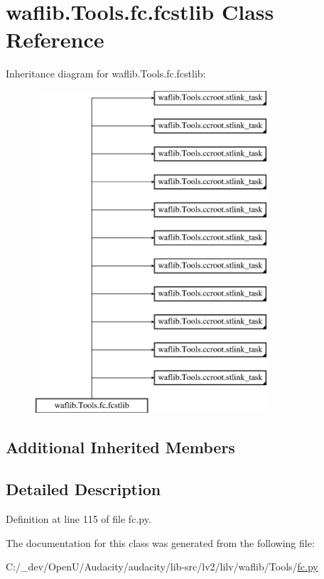 \hypertarget{classwaflib_1_1_tools_1_1fc_1_1fcstlib}{}\section{waflib.\+Tools.\+fc.\+fcstlib Class Reference}
\label{classwaflib_1_1_tools_1_1fc_1_1fcstlib}
Inheritance diagram for waflib.\+Tools.\+fc.\+fcstlib\+:\begin{figure}[H]
\begin{center}
\leavevmode
\includegraphics[height=12.000000cm]{classwaflib_1_1_tools_1_1fc_1_1fcstlib}
\end{center}
\end{figure}
\subsection*{Additional Inherited Members}


\subsection{Detailed Description}


Definition at line 115 of file fc.\+py.



The documentation for this class was generated from the following file\+:\begin{DoxyCompactItemize}
\item 
C\+:/\+\_\+dev/\+Open\+U/\+Audacity/audacity/lib-\/src/lv2/lilv/waflib/\+Tools/\hyperlink{lilv_2waflib_2_tools_2fc_8py}{fc.\+py}\end{DoxyCompactItemize}
